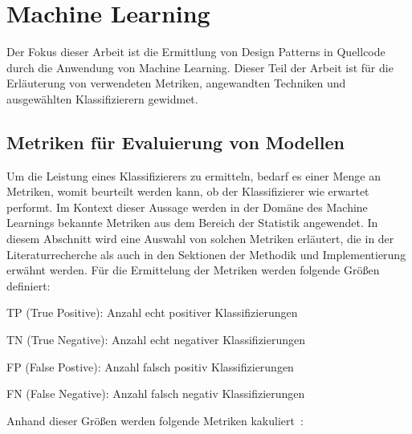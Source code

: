 \section{Machine Learning}

Der Fokus dieser Arbeit ist die Ermittlung von Design Patterns in Quellcode durch die Anwendung von Machine Learning.
Dieser Teil der Arbeit ist für die Erläuterung von verwendeten Metriken, angewandten Techniken und ausgewählten Klassifizierern gewidmet.

\subsection{Metriken für Evaluierung von Modellen}\label{metrics}

Um die Leistung eines Klassifizierers zu ermitteln, bedarf es einer Menge an Metriken, womit beurteilt werden kann, ob der Klassifizierer wie erwartet performt.
Im Kontext dieser Aussage werden in der Domäne des Machine Learnings bekannte Metriken aus dem Bereich der Statistik angewendet.
In diesem Abschnitt wird eine Auswahl von solchen Metriken erläutert, die in der Literaturrecherche als auch in den Sektionen der Methodik und Implementierung erwähnt werden.
Für die Ermittelung der Metriken werden folgende Größen definiert:

\begin{description}
    \item TP (True Positive): Anzahl echt positiver Klassifizierungen
    \item TN (True Negative): Anzahl echt negativer Klassifizierungen
    \item FP (False Postive): Anzahl falsch positiv Klassifizierungen
    \item FN (False Negative): Anzahl falsch negativ Klassifizierungen
\end{description}

Anhand dieser Größen werden folgende Metriken kakuliert~\cite[S. 3]{doi:10.1148/ryai.2021200126}:

